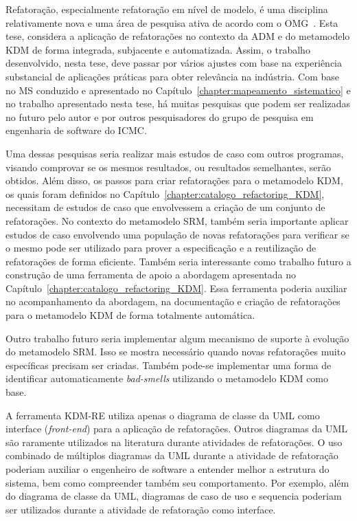 Refatoração, especialmente refatoração em nível de modelo, é uma disciplina relativamente nova e uma área de pesquisa ativa de acordo com o OMG~\cite{OMG_OMG, ADM:OMG}. Esta tese, considera a aplicação de refatorações no contexto da ADM e do metamodelo KDM de forma integrada, subjacente e automatizada. Assim, o trabalho desenvolvido, nesta tese, deve passar por vários ajustes com base na experiência substancial de aplicações práticas para obter relevância na indústria. Com base no MS conduzido e apresentado no Capítulo~\ref{chapter:mapeamento_sistematico} e no trabalho apresentado nesta tese, há muitas pesquisas que podem ser realizadas no futuro pelo autor e por outros pesquisadores do grupo de pesquisa em engenharia de software do ICMC.

Uma dessas pesquisas seria realizar mais estudos de caso com outros programas, visando comprovar se os mesmos resultados, ou resultados semelhantes, serão obtidos. Além disso, os passos para criar refatorações para o metamodelo KDM, os quais foram definidos no Capítulo~\ref{chapter:catalogo_refactoring_KDM}, necessitam de estudos de caso que envolvessem a criação de um conjunto de refatorações. No contexto do metamodelo SRM, também seria importante aplicar estudos de caso envolvendo uma população de novas refatorações para verificar se o mesmo pode ser utilizado para prover a especificação e a reutilização de refatorações de forma eficiente. Também seria interessante como trabalho futuro a construção de uma ferramenta de apoio a abordagem apresentada no Capítulo~\ref{chapter:catalogo_refactoring_KDM}. Essa ferramenta poderia auxiliar no acompanhamento da abordagem, na documentação e criação de refatorações para o metamodelo KDM de forma totalmente automática.

Outro trabalho futuro seria implementar algum mecanismo de suporte à evolução do metamodelo SRM. Isso se mostra necessário quando novas refatorações muito específicas precisam ser criadas. Também pode-se implementar uma forma de identificar automaticamente \textit{bad-smells} utilizando o metamodelo KDM como base. %


A ferramenta KDM-RE utiliza apenas o diagrama de classe da UML como interface (\textit{front-end}) para a aplicação de refatorações. Outros diagramas da UML são raramente utilizados na literatura durante atividades de refatorações. O uso combinado de múltiplos diagramas da UML durante a atividade de refatoração poderiam auxiliar o engenheiro de software a entender melhor a estrutura do sistema, bem como compreender também seu comportamento. Por exemplo, além do diagrama de classe da UML, diagramas de caso de uso e sequencia poderiam ser utilizados durante a atividade de refatoração como interface.

